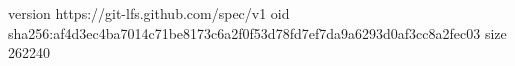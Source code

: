 version https://git-lfs.github.com/spec/v1
oid sha256:af4d3ec4ba7014c71be8173c6a2f0f53d78fd7ef7da9a6293d0af3cc8a2fec03
size 262240
